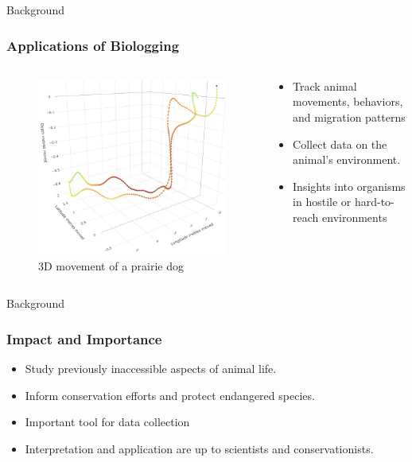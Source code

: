\documentclass{beamer}
\begin{document}
\begin{frame}{Background}
  \frametitle{Applications of Biologging}
  \begin{columns}
    \begin{column}{0.5\textwidth}
  \begin{figure}[htbp]
    \centering
    \includegraphics[width=\textwidth]{prairie_dog_map.jpg}
    \caption{3D movement of a prairie dog \cite{Kidangoor_2024}}
    \label{fig:prairie_dog_3D_movement}
  \end{figure}
\end{column}
\begin{column}{0.5\textwidth}
  \begin{itemize}
    \item Track animal movements, behaviors, and migration patterns
    \item Collect data on the animal's environment.
    \item Insights into organisms in hostile or hard-to-reach environments
  \end{itemize}
\end{column}
\end{columns}
\end{frame}

\begin{frame}{Background}
  \frametitle{Impact and Importance}
        \begin{itemize}
          \item Study previously inaccessible aspects of animal life.
          \item Inform conservation efforts and protect endangered species.
          \item Important tool for data collection
          \item Interpretation and application are up to scientists and conservationists.
        \end{itemize}
\end{frame}
\end{document}
